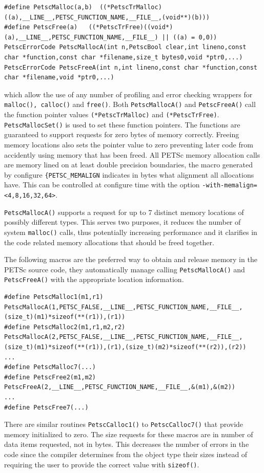 \begin{lstlisting}
#define PetscMalloc(a,b)  ((*PetscTrMalloc)((a),__LINE__,PETSC_FUNCTION_NAME,__FILE__,(void**)(b)))
#define PetscFree(a)   ((*PetscTrFree)((void*)(a),__LINE__,PETSC_FUNCTION_NAME,__FILE__) || ((a) = 0,0))
PetscErrorCode PetscMallocA(int n,PetscBool clear,int lineno,const char *function,const char *filename,size_t bytes0,void *ptr0,...)
PetscErrorCode PetscFreeA(int n,int lineno,const char *function,const char *filename,void *ptr0,...)
\end{lstlisting}
which allow the use of any number of profiling and error checking wrappers for \lstinline{malloc(), calloc()} and \lstinline{free()}.
Both \lstinline{PetscMallocA()} and \lstinline{PetscFreeA()} call the function pointer values  \lstinline{(*PetscTrMalloc)} and \lstinline{(*PetscTrFree)}.
\lstinline{PetscMallocSet()} is used to set these function pointers. 
The functions are guaranteed to support requests for zero bytes of memory correctly. Freeing memory locations also sets the pointer value to zero preventing later code from accidently using memory that has been freed. All PETSc memory allocation calls are memory lined on at least double precision boundaries, the macro generated by configure \lstinline{{PETSC_MEMALIGN} indicates in bytes what alignment all allocations have. This can be controlled at configure time with the option \lstinline{-with-memalign=<4,8,16,32,64>}. 


\lstinline{PetscMallocA()} supports a request for up to 7 distinct memory locations of possibly different types. This serves two purposes, it reduces the number of system  \lstinline{malloc()} calls, thus potentially increasing performance and it clarifies in the code related memory allocations that should be freed together.

The following macros are the preferred way to obtain and release memory in the PETSc source code, they automatically manage calling \lstinline{PetscMallocA()} and \lstinline{PetscFreeA()} with the appropriate location information.
\begin{lstlisting}
#define PetscMalloc1(m1,r1) PetscMallocA(1,PETSC_FALSE,__LINE__,PETSC_FUNCTION_NAME,__FILE__, (size_t)(m1)*sizeof(**(r1)),(r1))
#define PetscMalloc2(m1,r1,m2,r2) PetscMallocA(2,PETSC_FALSE,__LINE__,PETSC_FUNCTION_NAME,__FILE__, (size_t)(m1)*sizeof(**(r1)),(r1),(size_t)(m2)*sizeof(**(r2)),(r2))
...
#define PetscMalloc7(...)
#define PetscFree2(m1,m2)   PetscFreeA(2,__LINE__,PETSC_FUNCTION_NAME,__FILE__,&(m1),&(m2))
...
#define PetscFree7(...)
\end{lstlisting}
There are similar routines \lstinline{PetscCalloc1()}
to \lstinline{PetscCalloc7()} that provide memory initialized to
zero. The size requests for these macros are in number of data items
requested, not in bytes. This decreases the number of errors in the
code since the compiler determines from the object type their sizes
instead of requiring the user to provide the correct value with \lstinline{sizeof()}.

